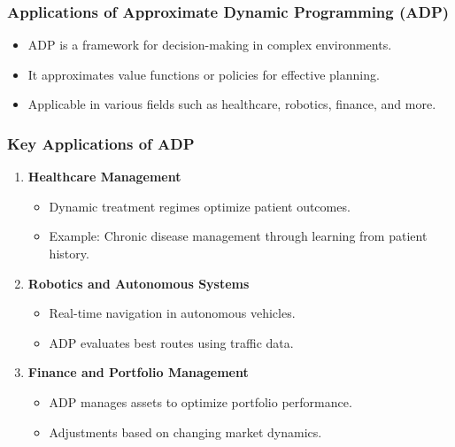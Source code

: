 \documentclass[aspectratio=169]{beamer}
\begin{document}
\begin{frame}[fragile]
    \frametitle{Applications of Approximate Dynamic Programming (ADP)}
    \begin{itemize}
        \item ADP is a framework for decision-making in complex environments.
        \item It approximates value functions or policies for effective planning.
        \item Applicable in various fields such as healthcare, robotics, finance, and more.
    \end{itemize}
\end{frame}

\begin{frame}[fragile]
    \frametitle{Key Applications of ADP}
    \begin{enumerate}
        \item \textbf{Healthcare Management}
            \begin{itemize}
                \item Dynamic treatment regimes optimize patient outcomes.
                \item Example: Chronic disease management through learning from patient history.
            \end{itemize}
        \item \textbf{Robotics and Autonomous Systems}
            \begin{itemize}
                \item Real-time navigation in autonomous vehicles.
                \item ADP evaluates best routes using traffic data.
            \end{itemize}
        \item \textbf{Finance and Portfolio Management}
            \begin{itemize}
                \item ADP manages assets to optimize portfolio performance.
                \item Adjustments based on changing market dynamics.
            \end{itemize}
    \end{enumerate}
\end{frame}
\end{document}
